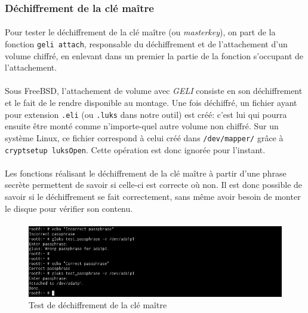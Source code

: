 \subsubsection{Déchiffrement de la clé maître}
\paragraph{}
Pour tester le déchiffrement de la clé maître (ou \textit{masterkey}), on part
de la fonction \texttt{geli attach}, responsable du déchiffrement et de
l'attachement d'un volume chiffré, en enlevant dans un premier la partie de
la fonction s'occupant de l'attachement.
\paragraph{}
Sous FreeBSD, l'attachement de volume avec \textit{GELI} consiste en son
déchiffrement et le fait de le rendre disponible au montage. Une fois déchiffré,
un fichier ayant pour extension \texttt{.eli} (ou \texttt{.luks} dans notre
outil) est créé: c'est lui qui pourra ensuite être monté comme n'importe-quel
autre volume non chiffré. Sur un système Linux, ce fichier correspond à celui
créé dans \texttt{/dev/mapper/} grâce à \texttt{cryptsetup luksOpen}. Cette
opération est donc ignorée pour l'instant.
\paragraph{}
Les fonctions réalisant le déchiffrement de la clé maître à partir d'une phrase
secrète permettent de savoir si celle-ci est correcte où non. Il est donc
possible de savoir si le déchiffrement se fait correctement, sans même avoir
besoin de monter le disque pour vérifier son contenu.
\paragraph{}
\begin{figure}[h]
\centering
\includegraphics[width=.9\linewidth]{tests/freebsd_test_passphrase.png}
\caption{\label{fig:freebsd_test_passphrase}Test de déchiffrement de la clé maître}
\end{figure}


